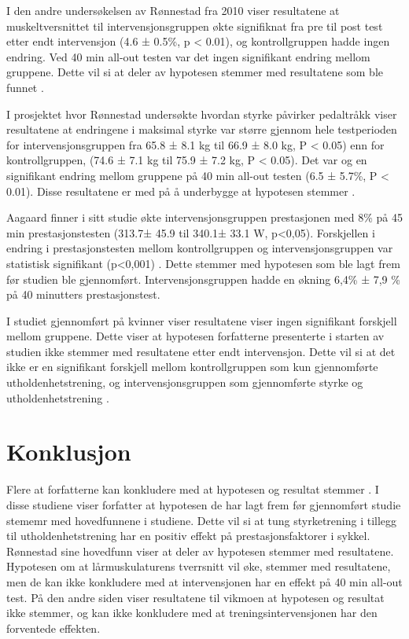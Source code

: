 \documentclass[
]{book}
\begin{document}
I den andre undersøkelsen av Rønnestad fra 2010 viser resultatene at muskeltversnittet til intervensjonsgruppen økte signifiknat fra pre til post test etter endt intervensjon (4.6 ± 0.5\%, p \textless{} 0.01), og kontrollgruppen hadde ingen endring. Ved 40 min all-out testen var det ingen signifikant endring mellom gruppene. Dette vil si at deler av hypotesen stemmer med resultatene som ble funnet \citep{rønnestad2010b}.

I prosjektet hvor Rønnestad undersøkte hvordan styrke påvirker pedaltråkk viser resultatene at endringene i maksimal styrke var større gjennom hele testperioden for intervensjonsgruppen fra 65.8 ± 8.1 kg til 66.9 ± 8.0 kg, P \textless{} 0.05) enn for kontrollgruppen, (74.6 ± 7.1 kg til 75.9 ± 7.2 kg, P \textless{} 0.05). Det var og en signifikant endring mellom gruppene på 40 min all-out testen (6.5 ± 5.7\%, P \textless{} 0.01). Disse resultatene er med på å underbygge at hypotesen stemmer \citep{rønnestad2015}.

Aagaard finner i sitt studie økte intervensjonsgruppen prestasjonen med 8\% på 45 min prestasjonstesten (313.7± 45.9 til 340.1± 33.1 W, p\textless0,05). Forskjellen i endring i prestasjonstesten mellom kontrollgruppen og intervensjonsgruppen var statistisk signifikant (p\textless0,001) \citep{aagaard2011}. Dette stemmer med hypotesen som ble lagt frem før studien ble gjennomført. Intervensjonsgruppen hadde en økning 6,4\% ± 7,9 \% på 40 minutters prestasjonstest.

I studiet gjennomført på kvinner viser resultatene viser ingen signifikant forskjell mellom gruppene. Dette viser at hypotesen forfatterne presenterte i starten av studien ikke stemmer med resultatene etter endt intervensjon. Dette vil si at det ikke er en signifikant forskjell mellom kontrollgruppen som kun gjennomførte utholdenhetstrening, og intervensjonsgruppen som gjennomførte styrke og utholdenhetstrening \citep{vikmoen2016}.

\hypertarget{konklusjon}{%
\section{Konklusjon}\label{konklusjon}}

Flere at forfatterne kan konkludere med at hypotesen og resultat stemmer \citep{aagaard2011, rønnestad2015, rønnestad2010a}. I disse studiene viser forfatter at hypotesen de har lagt frem før gjennomført studie stememr med hovedfunnene i studiene. Dette vil si at tung styrketrening i tillegg til utholdenhetstrening har en positiv effekt på prestasjonsfaktorer i sykkel. Rønnestad \citep{rønnestad2010b} sine hovedfunn viser at deler av hypotesen stemmer med resultatene. Hypotesen om at lårmuskulaturens tverrsnitt vil øke, stemmer med resultatene, men de kan ikke konkludere med at intervensjonen har en effekt på 40 min all-out test. På den andre siden viser resultatene til vikmoen \citep{vikmoen2016} at hypotesen og resultat ikke stemmer, og kan ikke konkludere med at treningsintervensjonen har den forventede effekten.
\end{document}
